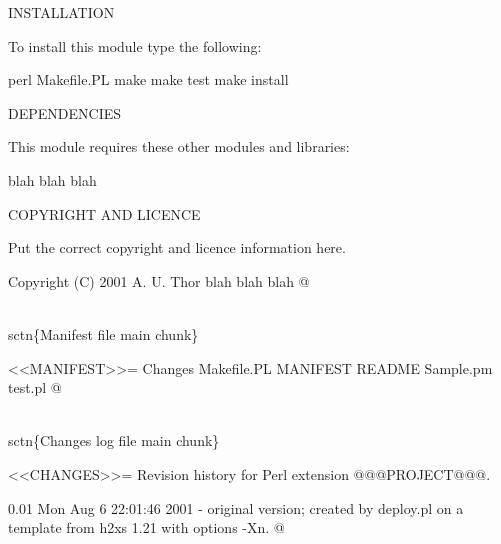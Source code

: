 \documentclass[11pt]{article}
\def\nwendcode{\endtrivlist \endgroup} %
\let\nwdocspar=\par                    %
\begin{document}
INSTALLATION

To install this module type the following:

   perl Makefile.PL
   make
   make test
   make install

DEPENDENCIES

This module requires these other modules and libraries:

  blah blah blah

COPYRIGHT AND LICENCE

Put the correct copyright and licence information here.

Copyright (C) 2001 A. U. Thor blah blah blah
@ 
\nwendcode{}\nwdocspar

\nwenddocs{}\plusendmoddef
\\sctn\{Manifest file main chunk\}

<<MANIFEST>>=
Changes
Makefile.PL
MANIFEST
README
Sample.pm
test.pl
@ 
\nwendcode{}\nwdocspar

\nwenddocs{}\plusendmoddef
\\sctn\{Changes log file main chunk\}

<<CHANGES>>=
Revision history for Perl extension @@@PROJECT@@@.

0.01  Mon Aug  6 22:01:46 2001
        - original version; created by deploy.pl on
          a template from h2xs 1.21 with options -Xn.
@ 
\nwendcode{}\nwdocspar

\end{document}
